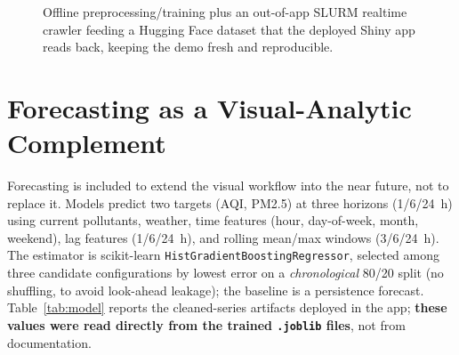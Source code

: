 \documentclass[a4paper]{article}
\begin{document}
\begin{figure}[H]
\centering
{}
\caption{Offline preprocessing/training plus an out-of-app SLURM realtime crawler feeding a Hugging Face
dataset that the deployed Shiny app reads back, keeping the demo fresh and reproducible.}
\label{fig:arch}
\end{figure}

\section{Forecasting as a Visual-Analytic Complement}
Forecasting is included to extend the visual workflow into the near future, not to replace it. Models
predict two targets (AQI, PM2.5) at three horizons (1/6/24~h) using current pollutants, weather, time
features (hour, day-of-week, month, weekend), lag features (1/6/24~h), and rolling mean/max windows
(3/6/24~h). The estimator is scikit-learn \texttt{HistGradientBoostingRegressor}, selected among three
candidate configurations by lowest error on a \emph{chronological} 80/20 split (no shuffling, to avoid
look-ahead leakage); the baseline is a persistence forecast. Table~\ref{tab:model} reports the cleaned-series
artifacts deployed in the app; \textbf{these values were read directly from the trained
\texttt{.joblib} files}, not from documentation.
\end{document}
